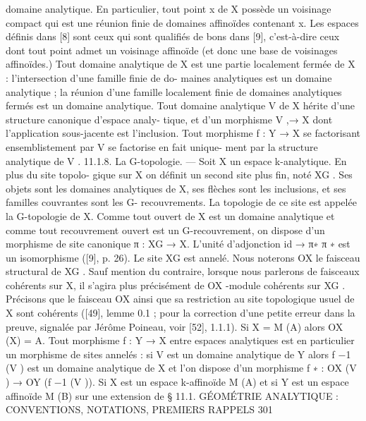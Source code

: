 \documentclass[
  10pt,
]{article}
\newenvironment{Shaded}{}{}
\newcommand{\NormalTok}[1]{#1}
\begin{document}
\begin{Shaded}
\begin{Highlighting}[]
\NormalTok{domaine analytique. En particulier, tout point x de X possède un voisinage compact}
\NormalTok{qui est une réunion finie de domaines affinoïdes contenant x. Les espaces définis dans [8]}
\NormalTok{sont ceux qui sont qualifiés de bons dans [9], c’est{-}à{-}dire ceux dont tout point admet un}
\NormalTok{voisinage affinoïde (et donc une base de voisinages affinoïdes.) Tout domaine analytique}
\NormalTok{de X est une partie localement fermée de X : l’intersection d’une famille finie de do{-}}
\NormalTok{maines analytiques est un domaine analytique ; la réunion d’une famille localement finie}
\NormalTok{de domaines analytiques fermés est un domaine analytique.}
\NormalTok{   Tout domaine analytique V de X hérite d’une structure canonique d’espace analy{-}}
\NormalTok{tique, et d’un morphisme V ,→ X dont l’application sous{-}jacente est l’inclusion. Tout}
\NormalTok{morphisme f : Y → X se factorisant ensemblistement par V se factorise en fait unique{-}}
\NormalTok{ment par la structure analytique de V .}
\NormalTok{11.1.8. La G{-}topologie. — Soit X un espace k{-}analytique. En plus du site topolo{-}}
\NormalTok{gique sur X on définit un second site plus fin, noté XG . Ses objets sont les domaines}
\NormalTok{analytiques de X, ses flèches sont les inclusions, et ses familles couvrantes sont les G{-}}
\NormalTok{recouvrements. La topologie de ce site est appelée la G{-}topologie de X.}
\NormalTok{  Comme tout ouvert de X est un domaine analytique et comme tout recouvrement}
\NormalTok{ouvert est un G{-}recouvrement, on dispose d’un morphisme de site canonique π : XG →}
\NormalTok{X. L’unité d’adjonction id → π∗ π ∗ est un isomorphisme ([9], p. 26).}
\NormalTok{  Le site XG est annelé. Nous noterons OX le faisceau structural de XG . Sauf mention du}
\NormalTok{contraire, lorsque nous parlerons de faisceaux cohérents sur X, il s’agira plus précisément}
\NormalTok{de OX {-}module cohérents sur XG . Précisons que le faisceau OX ainsi que sa restriction}
\NormalTok{au site topologique usuel de X sont cohérents ([49], lemme 0.1 ; pour la correction d’une}
\NormalTok{petite erreur dans la preuve, signalée par Jérôme Poineau, voir [52], 1.1.1). Si X = M (A)}
\NormalTok{alors OX (X) = A.}
\NormalTok{  Tout morphisme f : Y → X entre espaces analytiques est en particulier un morphisme}
\NormalTok{de sites annelés : si V est un domaine analytique de Y alors f −1 (V ) est un domaine}
\NormalTok{analytique de X et l’on dispose d’un morphisme f ∗ : OX (V ) → OY (f −1 (V )). Si X est}
\NormalTok{un espace k{-}affinoïde M (A) et si Y est un espace affinoïde M (B) sur une extension de}
\NormalTok{     § 11.1. GÉOMÉTRIE ANALYTIQUE : CONVENTIONS, NOTATIONS, PREMIERS RAPPELS               301}


\end{Highlighting}
\end{Shaded}
\end{document}
